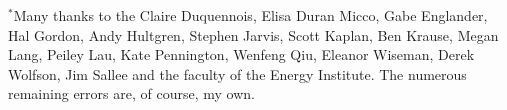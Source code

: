 \documentclass[11pt,letterpaper,oneside]{article}
\begin{document}
\vspace{3in plus 2in minus 1.7in}
{\footnotesize
\noindent
$^*$Many thanks to the Claire Duquennois, Elisa Duran Micco, Gabe Englander, Hal Gordon, Andy Hultgren, Stephen Jarvis, Scott Kaplan, Ben Krause, Megan Lang, Peiley Lau, Kate Pennington, Wenfeng Qiu, Eleanor Wiseman, Derek Wolfson, Jim Sallee and the faculty of the Energy Institute.
The numerous remaining errors are, of course, my own.
}
%
%
%
%
%
\end{document}
